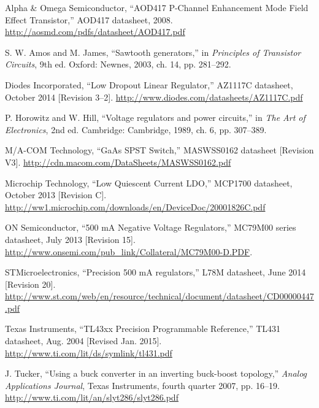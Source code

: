 \begin{thebibliography}{9}

Alpha \& Omega Semiconductor, ``AOD417 P-Channel Enhancement Mode Field Effect Transistor,''
AOD417 datasheet, 2008. \url{http://aosmd.com/pdfs/datasheet/AOD417.pdf}

S. W. Amos and M. James, ``Sawtooth generators,'' in
\emph{Principles of Transistor Circuits}, 9th ed. Oxford: Newnes, 2003, ch. 14, pp. 281--292.

Diodes Incorporated, ``Low Dropout Linear Regulator,'' AZ1117C datasheet,
October 2014 [Revision 3--2].
\url{http://www.diodes.com/datasheets/AZ1117C.pdf}

P. Horowitz and W. Hill, ``Voltage regulators and power circuits,'' in
\emph{The Art of Electronics}, 2nd ed. Cambridge: Cambridge, 1989, ch. 6, pp. 307--389.

M/A-COM Technology, ``GaAs SPST Switch,'' MASWSS0162 datasheet [Revision V3].
\url{http://cdn.macom.com/DataSheets/MASWSS0162.pdf}

Microchip Technology, ``Low Quiescent Current LDO,'' MCP1700 datasheet,
October 2013 [Revision C].
\url{http://ww1.microchip.com/downloads/en/DeviceDoc/20001826C.pdf}

ON Semiconductor, ``500 mA Negative Voltage Regulators,'' MC79M00 series datasheet,
July 2013 [Revision 15].
\url{http://www.onsemi.com/pub_link/Collateral/MC79M00-D.PDF}.

STMicroelectronics, ``Precision 500 mA regulators,'' L78M datasheet, June 2014 [Revision 20].
\url{http://www.st.com/web/en/resource/technical/document/datasheet/CD00000447.pdf}

Texas Instruments, ``TL43xx Precision Programmable Reference,''
TL431 datasheet, Aug. 2004 [Revised Jan. 2015]. \url{http://www.ti.com/lit/ds/symlink/tl431.pdf}

J. Tucker, ``Using a buck converter in an inverting buck-boost topology,''
\emph{Analog Applications Journal}, Texas Instruments, fourth quarter 2007, pp. 16--19.
\url{http://www.ti.com/lit/an/slyt286/slyt286.pdf}
\end{thebibliography}
